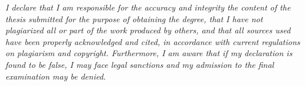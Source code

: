 \thispagestyle{empty}
\vspace*{\fill}
\noindent\textit{I declare that I am responsible for the accuracy and integrity the content of the thesis submitted for the purpose of obtaining the degree, that I have not plagiarized all or part of the work produced by others, and that all sources used have been properly acknowledged and cited, in accordance with current regulations on plagiarism and copyright. Furthermore, I am aware that if my declaration is found to be false, I may face legal sanctions and my admission to the final examination may be denied.}
\vspace*{\fill}